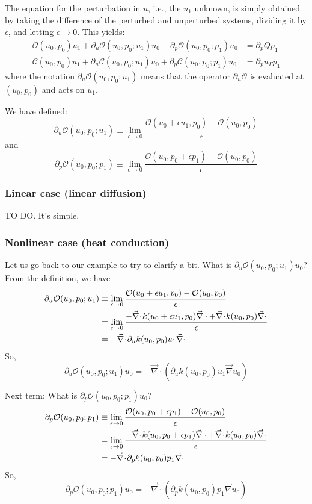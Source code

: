 \documentclass[11pt]{article}
\renewcommand{\div}{\vec{\nabla}\! \cdot \!}
\newcommand{\grad}{\vec{\nabla}}
\newcommand{\be}{\begin{equation}}
\newcommand{\ee}{\end{equation}}
\renewcommand{\O}{\mathcal{O}}
\newcommand{\mc}[1]{\mathcal{#1}}
\begin{document}
The equation for the perturbation in $u$, i.e., the $u_1$ unknown, is simply obtained by
taking the difference of the perturbed and unperturbed systems, dividing it by $\epsilon$, and 
letting $\epsilon \rightarrow 0$. This yields:
\begin{align}
\O(u_0,p_0) u_1 + \partial_u\O(u_0,p_0;u_1)u_0 + \partial_p \O(u_0,p_0;p_1) u_0 &= \partial_p Q p_1  \\
\mc{C}(u_0,p_0) u_1 +  \partial_u \mc{C}(u_0,p_0;u_1)u_0 + \partial_p \mc{C}(u_0,p_0;p_1)u_0  &=\partial_p u_\Gamma p_1
\end{align}
%
where the notation $\partial_u\O(u_0,p_0;u_1)$ means that the operator $\partial_u\O$ is evaluated at
$(u_0,p_0)$ and acts on $u_1$. 

We have defined:
\be
\partial_u\O(u_0,p_0;u_1) 
\equiv \lim_{\epsilon \rightarrow 0} \frac{\O(u_0+\epsilon u_1,p_0) - \O(u_0,p_0)}{\epsilon} 
\ee
and
\be
\partial_p\O(u_0,p_0;p_1) 
\equiv \lim_{\epsilon \rightarrow 0} \frac{\O(u_0,p_0+\epsilon p_1) - \O(u_0,p_0)}{\epsilon} 
\ee

\subsubsection{Linear case (linear diffusion)}
TO DO. It's simple.

\subsubsection{Nonlinear case (heat conduction)}
Let us go back to our example to try to clarify a bit. What is $\partial_u\O(u_0,p_0;u_1)u_0$?
From the definition, we have
\begin{align}
\partial_u\O(u_0,p_0;u_1) 
&\equiv \lim_{\epsilon \rightarrow 0} \frac{\O(u_0+\epsilon u_1,p_0) - \O(u_0,p_0)}{\epsilon} \notag \\
&= \lim_{\epsilon \rightarrow 0} \frac{-\div k(u_0+\epsilon u_1,p_0)\grad \cdot +\div k(u_0,p_0)\grad \cdot}{\epsilon} \notag \\
&= -\div \partial_u k(u_0,p_0) u_1\grad \cdot 
\end{align}
So,
\be
\partial_u\O(u_0,p_0;u_1)u_0 =  -\div \left( \partial_u k(u_0,p_0) u_1\grad u_0 \right)
\ee

Next term: What is $\partial_p\O(u_0,p_0;p_1)u_0$?
\begin{align}
\partial_p\O(u_0,p_0;p_1) 
&\equiv \lim_{\epsilon \rightarrow 0} \frac{\O(u_0,p_0+\epsilon p_1) - \O(u_0,p_0)}{\epsilon} \notag \\
&= \lim_{\epsilon \rightarrow 0} \frac{-\div k(u_0,p_0+\epsilon p_1)\grad \cdot +\div k(u_0,p_0)\grad \cdot}{\epsilon} \notag \\
&= -\div \partial_p k(u_0,p_0) p_1\grad \cdot 
\end{align}
So,
\be
\partial_p\O(u_0,p_0;p_1)u_0 =  -\div \left( \partial_p k(u_0,p_0) p_1\grad u_0 \right)
\ee
\end{document}
